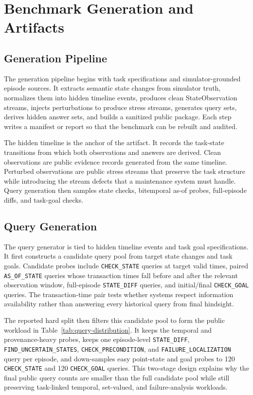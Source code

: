 \documentclass[conference]{IEEEtran}
\begin{document}
\section{Benchmark Generation and Artifacts}
\label{sec:generation}

\subsection{Generation Pipeline}

The generation pipeline begins with task specifications and simulator-grounded episode sources. It extracts semantic state changes from simulator truth, normalizes them into hidden timeline events, produces clean StateObservation streams, injects perturbations to produce stress streams, generates query sets, derives hidden answer sets, and builds a sanitized public package. Each step writes a manifest or report so that the benchmark can be rebuilt and audited.

The hidden timeline is the anchor of the artifact. It records the task-state transitions from which both observations and answers are derived. Clean observations are public evidence records generated from the same timeline. Perturbed observations are public stress streams that preserve the task structure while introducing the stream defects that a maintenance system must handle. Query generation then samples state checks, bitemporal as-of probes, full-episode diffs, and task-goal checks.

\subsection{Query Generation}

The query generator is tied to hidden timeline events and task goal specifications. It first constructs a candidate query pool from target state changes and task goals. Candidate probes include \texttt{CHECK\_STATE} queries at target valid times, paired \texttt{AS\_OF\_STATE} queries whose transaction times fall before and after the relevant observation window, full-episode \texttt{STATE\_DIFF} queries, and initial/final \texttt{CHECK\_GOAL} queries. The transaction-time pair tests whether systems respect information availability rather than answering every historical query from final hindsight.

The reported hard split then filters this candidate pool to form the public workload in Table~\ref{tab:query-distribution}. It keeps the temporal and provenance-heavy probes, keeps one episode-level \texttt{STATE\_DIFF}, \texttt{FIND\_UNCERTAIN\_STATES}, \texttt{CHECK\_PRECONDITION}, and \texttt{FAILURE\_LOCALIZATION} query per episode, and down-samples easy point-state and goal probes to 120 \texttt{CHECK\_STATE} and 120 \texttt{CHECK\_GOAL} queries. This two-stage design explains why the final public query counts are smaller than the full candidate pool while still preserving task-linked temporal, set-valued, and failure-analysis workloads.
\end{document}

